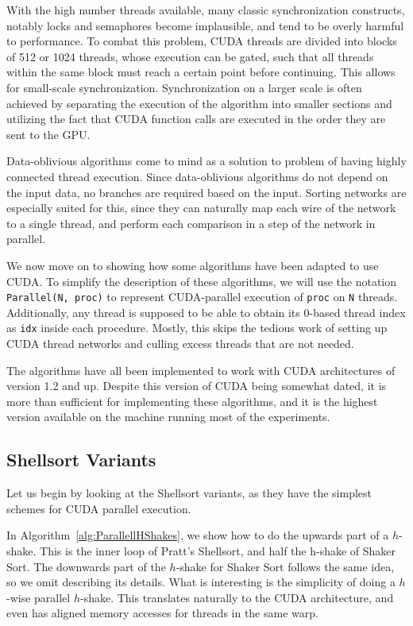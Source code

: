 With the high number threads available, many classic synchronization constructs, notably locks and semaphores become implausible, and tend to be overly harmful to performance. To combat this problem, CUDA threads are divided into blocks of 512 or 1024 threads, whose execution can be gated, such that all threads within the same block must reach a certain point before continuing. This allows for small-scale synchronization.
Synchronization on a larger scale is often achieved by separating the execution of the algorithm into smaller sections and utilizing the fact that CUDA function calls are executed in the order they are sent to the GPU.

Data-oblivious algorithms come to mind as a solution to problem of having highly connected thread execution. Since data-oblivious algorithms do not depend on the input data, no branches are required based on the input. Sorting networks are especially suited for this, since they can naturally map each wire of the network to a single thread, and perform each comparison in a step of the network in parallel.

We now move on to showing how some algorithms have been adapted to use CUDA. To simplify the description of these algorithms, we will use the notation \texttt{Parallel(N, proc)} to represent CUDA-parallel execution of \texttt{proc} on \texttt{N} threads. Additionally, any thread is supposed to be able to obtain its 0-based thread index as \texttt{idx} inside each procedure. Mostly, this skips the tedious work of setting up CUDA thread networks and culling excess threads that are not needed.

The algorithms have all been implemented to work with CUDA architectures of version 1.2 and up. Despite this version of CUDA being somewhat dated, it is more than sufficient for implementing these algorithms, and it is the highest version available on the machine running most of the experiments. 

\subsection{Shellsort Variants}

Let us begin by looking at the Shellsort variants, as they have the simplest schemes for CUDA parallel execution.

In Algorithm~\ref{alg:ParallellHShakes}, we show how to do the upwards part of a $h$-shake. This is the inner loop of Pratt's Shellsort, and half the h-shake of Shaker Sort. The downwards part of the $h$-shake for Shaker Sort follows the same idea, so we omit describing its details.
What is interesting is the simplicity of doing a $h$-wise parallel $h$-shake. This translates naturally to the CUDA architecture, and even has aligned memory accesses for threads in the same warp.

